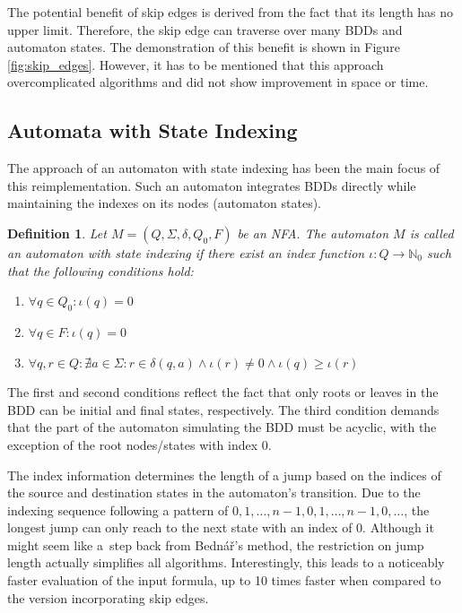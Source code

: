 \documentclass[pdflatex,sn-mathphys-num]{sn-jnl}%
\theoremstyle{thmstyleone}%
\theoremstyle{thmstyletwo}%
\theoremstyle{thmstylethree}%
\newtheorem{definition}{Definition}%
\begin{document}
        The potential benefit of skip edges is derived from the fact that its length has no upper limit. Therefore, the skip edge can traverse over many BDDs and automaton states. The demonstration of this benefit is shown in Figure \ref{fig:skip_edges}. However, it has to be mentioned that this approach overcomplicated algorithms and did not show improvement in space or time.


    \subsection{Automata with State Indexing}
        The approach of an automaton with state indexing has been the main focus of this reimplementation. Such an automaton integrates BDDs directly while maintaining the indexes on its nodes (automaton states).

        \vspace*{0.5em}

        \begin{definition}
            Let $M = (Q, \Sigma, \delta, Q_0, F)$ be an NFA. The automaton $M$ is called an automaton with state indexing if there exist an index function $\iota : Q \rightarrow \mathbb{N}_0$ such that the following conditions hold:
            \begin{enumerate}[noindent]
                \item $\forall q \in Q_0 : \iota(q) = 0$
                \item $\forall q \in F : \iota(q) = 0$
                \item $\forall q, r \in Q : \nexists a \in \Sigma : r \in \delta(q, a) \land \iota(r) \neq 0 \land \iota(q) \geq \iota(r)$
            \end{enumerate}
        \end{definition}

        The first and second conditions reflect the fact that only roots or leaves in the BDD can be initial and final states, respectively. The third condition demands that the part of the automaton simulating the BDD must be acyclic, with the exception of the root nodes/states with index 0.

        The index information determines the length of a jump based on the indices of the source and destination states in the automaton's transition. Due to the indexing sequence following a pattern of $0, 1, \dots, n-1, 0, 1, \dots, n-1, 0, \dots$, the longest jump can only reach to the next state with an index of $0$. Although it might seem like a~step back from Bednář's method, the restriction on jump length actually simplifies all algorithms. Interestingly, this leads to a noticeably faster evaluation of the input formula, up to 10 times faster when compared to the version incorporating skip edges.
\end{document}
